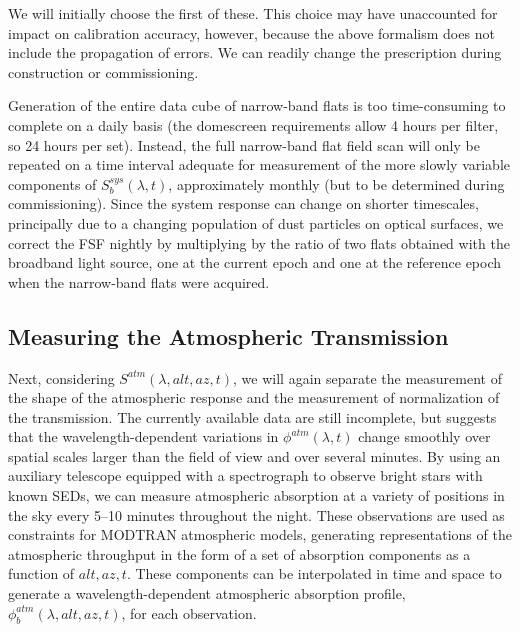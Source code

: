 \documentclass[12pt,preprint]{aastex}
\begin{document}
We will initially choose the first of these.  This choice may have unaccounted for impact on calibration 
accuracy, however, because the above formalism does not include the
propagation of errors.  We can readily change the prescription during construction or commissioning.


Generation of the entire data cube of narrow-band flats is too time-consuming to complete on a daily
basis (the domescreen requirements allow 4 hours per filter, so 24 hours per set).
Instead, the full narrow-band flat field scan will only be
repeated on a time interval adequate for measurement of
the more slowly variable components of $S_b^{sys}(\lambda,t)$, approximately
monthly (but to be determined during commissioning).   Since the system response can change 
on shorter timescales, principally due to a changing population of dust particles on optical surfaces, we correct the FSF
nightly by multiplying by the ratio of two flats obtained with the broadband light source, one at the current epoch and one at the 
reference epoch when the narrow-band flats were acquired.

\subsection{Measuring the Atmospheric Transmission}
\label{sec:atmmeas}
Next, considering $S^{atm}(\lambda,alt,az,t)$, we will again separate
the measurement of the shape of the atmospheric response and the
measurement of normalization of the transmission.  The currently
available data are still incomplete, but suggests that the
wavelength-dependent variations in $\phi^{atm}(\lambda,t)$ change
smoothly over spatial scales larger than the field of view and over
several minutes.  By using an auxiliary telescope equipped with a
spectrograph to observe bright stars with known SEDs, we can measure
atmospheric absorption at a variety of positions in the sky every
5--10 minutes throughout the night. These observations are used as
constraints for MODTRAN atmospheric models, generating representations
of the atmospheric throughput in the form of a set of absorption
components as a function of $alt,az,t$. These components can be
interpolated in time and space to generate a wavelength-dependent
atmospheric absorption profile, $\phi_b^{atm}(\lambda,alt,az,t)$, for
each observation.
\end{document}
